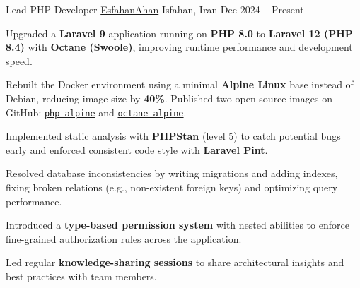 
\begin{cventries}

	\cventry
	{Lead PHP Developer}
	{\href{https://esfahanahan.com}{EsfahanAhan}}
	{Isfahan, Iran}
	{Dec 2024 – Present}
	{
		\begin{cvitems}
			\item {Upgraded a \textbf{Laravel 9} application running on \textbf{PHP 8.0} to \textbf{Laravel 12 (PHP 8.4)} with \textbf{Octane (Swoole)}, improving runtime performance and development speed.}
			\item {Rebuilt the Docker environment using a minimal \textbf{Alpine Linux} base instead of Debian, reducing image size by \textbf{40\%}. Published two open-source images on GitHub: \href{https://github.com/esfahanahan/php-alpine}{\texttt{php-alpine}} and \href{https://github.com/esfahanahan/octane-alpine}{\texttt{octane-alpine}}.}
			\item {Implemented static analysis with \textbf{PHPStan} (level 5) to catch potential bugs early and enforced consistent code style with \textbf{Laravel Pint}.}
			\item {Resolved database inconsistencies by writing migrations and adding indexes, fixing broken relations (e.g., non-existent foreign keys) and optimizing query performance.}
			\item {Introduced a \textbf{type-based permission system} with nested abilities to enforce fine-grained authorization rules across the application.}
			\item {Led regular \textbf{knowledge-sharing sessions} to share architectural insights and best practices with team members.}
		\end{cvitems}
	}


\end{cventries}
